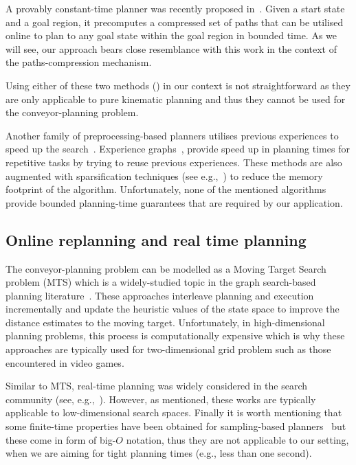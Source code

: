 \documentclass[conference]{IEEEtran}
\begin{document}
A provably constant-time planner was recently proposed in~\cite{islam2019planning}. Given a start state and a goal region, it precomputes a compressed set of paths that can be utilised online to plan to any goal state within the goal region in bounded time. As we will see, our approach bears close resemblance with this work in the context of the paths-compression mechanism.
%

Using either of these two methods (\cite{islam2019planning,kavraki1996probabilistic}) in our context is not straightforward as they are only applicable to pure kinematic planning and thus they cannot be used for the conveyor-planning problem.
%

Another family of preprocessing-based planners utilises previous experiences to speed up the search~\cite{BAG12,CSMOC15,PCCL12}. Experience graphs~\cite{PCCL12}, provide speed up in planning times for repetitive tasks by trying to reuse previous experiences. These methods are also augmented with sparsification techniques (see e.g.,~\cite{DB14,SSAH14}) to reduce the memory footprint of the algorithm.
Unfortunately, none of the mentioned algorithms provide bounded planning-time guarantees that are required by our application.

\subsection{Online replanning and real time planning}
The conveyor-planning problem can be modelled as a Moving Target Search problem (MTS) which is a widely-studied topic in the graph search-based planning literature~\cite{ishida1991moving,ishida1995moving,koenig2007speeding,sun2010moving}. 
These approaches interleave planning and execution incrementally and update the heuristic values of the state space to improve the distance estimates to the moving target. Unfortunately, in high-dimensional planning problems, this process is computationally expensive which is why these approaches are typically used for two-dimensional grid problem such as those encountered in video games.

Similar to MTS, real-time planning was widely considered in the search community (see, e.g.,~\cite{KL06,KS09,korf1990real}).
However, as mentioned, these works are typically applicable to low-dimensional search spaces.
%
Finally it is worth mentioning that some finite-time properties have been obtained for sampling-based planners~\cite{JansonIP18} but these come in form of big-$O$ notation, thus they are not applicable to our setting, when we are aiming for tight planning times (e.g., less than one second).
\end{document}
